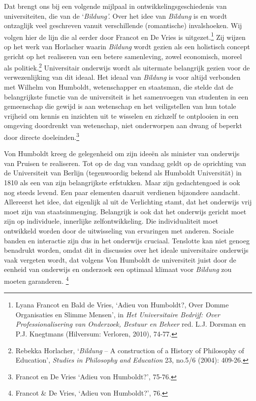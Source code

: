 \documentclass[smallauthor, chapterhaspagenum, nochapterinheader, pagenuminheader,  bigchapnum,medium2, tocpages,  garamond, titleinheader]{jote-book}
\begin{document}
	Dat brengt ons bij een volgende mijlpaal in ontwikkelingsgeschiedenis van universiteiten, die van de ‘\emph{Bildung}\emph{'}\emph{. }Over het idee van \emph{Bildung} is en wordt ontzaglijk veel geschreven vanuit verschillende (romantische) invalshoeken. Wij volgen hier de lijn die al eerder door Francot en De Vries is uitgezet.\footnote{Lyana Francot en Bald de Vries, ‘Adieu von Humboldt?, Over Domme Organisaties en Slimme Mensen', in\emph{ Het Universitaire Bedrijf: Over Professionalisering van Onderzoek, Bestuur en Beheer}\emph{ }red. L.J. Dorsman en P.J. Knegtmans (Hilversum: Verloren, 2010), 74-77.} Zij wijzen op het werk van Horlacher waarin \emph{Bildung} wordt gezien als een holistisch concept gericht op het realiseren van een betere samenleving, zowel economisch, moreel als politiek.\footnote{Rebekka Horlacher, ‘\emph{Bildung} -- A construction of a History of Philosophy of Education', \emph{Studies in }\emph{Philosophy}\emph{ }\emph{and}\emph{ }\emph{Education} 23, no.5/6 (2004): 409-26.} Universitair onderwijs wordt als uitermate belangrijk gezien voor de verwezenlijking van dit ideaal. Het ideaal van \emph{Bildung} is voor altijd verbonden met Wilhelm von Humboldt, wetenschapper en staatsman, die stelde dat de belangrijkste functie van de universiteit is het samenvoegen van studenten in een gemeenschap die gewijd is aan wetenschap en het veiligstellen van hun totale vrijheid om kennis en inzichten uit te wisselen en zichzelf te ontplooien in een omgeving doordrenkt van wetenschap, niet onderworpen aan dwang of beperkt door directe doeleinden.\footnote{Francot en De Vries ‘Adieu von Humboldt?', 75-76.}



	Von Humboldt kreeg de gelegenheid om zijn ideeën als minister van onderwijs van Pruisen te realiseren. Tot op de dag van vandaag geldt op de oprichting van de Universiteit van Berlijn (tegenwoordig bekend als Humboldt Universität) in 1810 als een van zijn belangrijkste erfstukken. Maar zijn gedachtengoed is ook nog steeds levend. Een paar elementen daaruit verdienen bijzondere aandacht. Allereerst het idee, dat eigenlijk al uit de Verlichting stamt, dat het onderwijs vrij moet zijn van staatsinmenging. Belangrijk is ook dat het onderwijs gericht moet zijn op individuele, innerlijke zelfontwikkeling. Die individualiteit moet ontwikkeld worden door de uitwisseling van ervaringen met anderen. Sociale banden en interactie zijn dus in het onderwijs cruciaal. Tenslotte kan niet genoeg benadrukt worden, omdat dit in discussies over het ideale universitaire onderwijs vaak vergeten wordt, dat volgens Von Humboldt de universiteit juist door de eenheid van onderwijs en onderzoek een optimaal klimaat voor \emph{Bildung} zou moeten garanderen.\textsuperscript{ }\footnote{Francot \& De Vries, ‘Adieu von Humboldt?', 76.}
\end{document}
